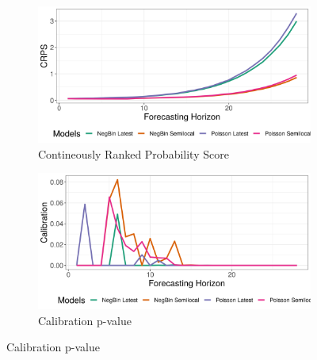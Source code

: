 \begin{figure}[H]
\begin{subfigure}{0.5\textwidth}
  \centering
  \includegraphics[width=\linewidth]{../output/Biena_crps.png}  
  \caption{Contineously Ranked Probability Score}
  \label{Biena_scores_1}
\end{subfigure}
\begin{subfigure}{0.5\textwidth}
  \centering
  \includegraphics[width=\linewidth]{../output/Biena_calibration.png}  
  \caption{Calibration p-value}
  \label{Biena_scores_2}
\end{subfigure}


\end{figure}

